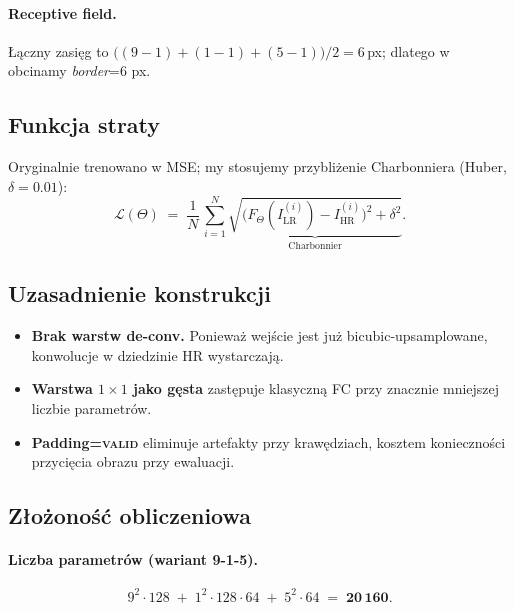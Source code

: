 \documentclass[11pt]{article}
\begin{document}
\paragraph{Receptive field.}
Łączny zasięg to
\(\bigl((9-1) + (1-1) + (5-1)\bigr)/2 = 6\)\,px; dlatego w
obcinamy \emph{border}=\num{6} px.

\subsection{Funkcja straty}

Oryginalnie trenowano w MSE; my stosujemy przybliżenie Charbonniera
(Huber, $\delta=0.01$):
\begin{equation}
  \mathcal L(\Theta) \;=\;
  \frac1{N} \,\sum_{i=1}^{N} 
    \underbrace{\sqrt{ \bigl(F_\Theta(I_\mathrm{LR}^{(i)}) -
                              I_\mathrm{HR}^{(i)}\bigr)^{2} + \delta^{2}}}
                _{\text{Charbonnier}}\!.
\end{equation}

\subsection{Uzasadnienie konstrukcji}

\begin{itemize}
  \item \textbf{Brak warstw de-conv.}  Ponieważ wejście jest już
        bicubic-up­samp­lo­wa­ne, konwolucje w dziedzinie HR wystarczają.
  \item \textbf{Warstwa $1\times1$ jako gęsta} zastępuje klasyczną FC
        przy znacznie mniejszej liczbie parametrów.
  \item \textbf{Padding=\textsc{valid}} eliminuje artefakty przy krawędziach,
        kosztem konieczności przycięcia obrazu przy ewaluacji.
\end{itemize}
\subsection{Złożoność obliczeniowa}
\label{sec:flops}

\paragraph{Liczba parametrów (wariant 9-1-5).}

\[
  9^{2}\!\cdot\!128
  \;+\;
  1^{2}\!\cdot\!128\!\cdot\!64
  \;+\;
  5^{2}\!\cdot\!64
  \;=\;
  \mathbf{20\,160}.
\]
\end{document}
